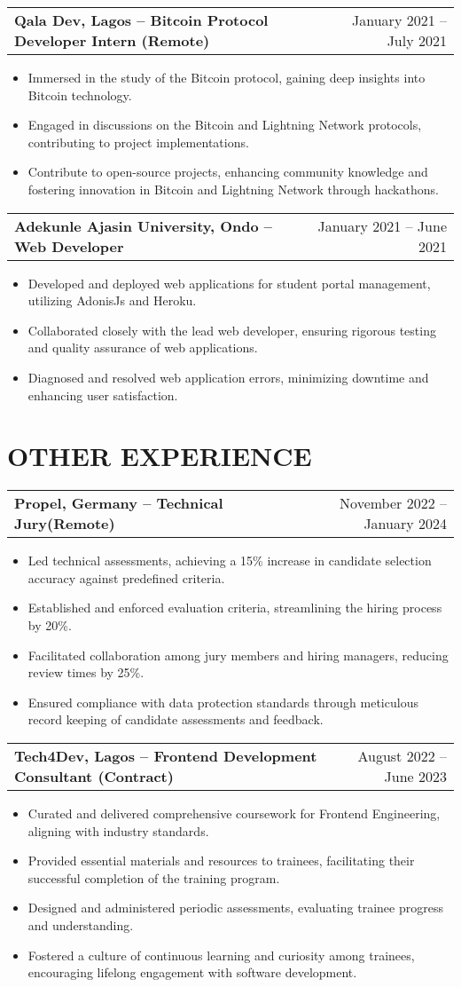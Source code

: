 \documentclass[a4paper,12pt]{article}
\makeatletter
\newenvironment{joblong}[2]{%
  \begin{tabularx}{\linewidth}{@{}X r@{}}%
    \textbf{#1} & #2 \\[3.75pt]%
  \end{tabularx}%
  \begin{minipage}[t]{\linewidth}%
  \begin{itemize}[nosep,after=\strut,leftmargin=1em,itemsep=3pt,label=--]%
  \ignorespaces
}{%
  \end{itemize}%
  \end{minipage}%
}
\makeatother
\begin{document}
\begin{joblong}{Qala Dev, Lagos -- Bitcoin Protocol Developer Intern (Remote)}{January 2021 -- July 2021}
\item Immersed in the study of the Bitcoin protocol, gaining deep insights into Bitcoin technology.
\item Engaged in discussions on the Bitcoin and Lightning Network protocols, contributing to project implementations.
\item Contribute to open-source projects, enhancing community knowledge and fostering innovation in Bitcoin and Lightning Network through hackathons.
\end{joblong}

\begin{joblong}{Adekunle Ajasin University, Ondo -- Web Developer}{January 2021 -- June 2021}
\item Developed and deployed web applications for student portal management, utilizing AdonisJs and Heroku.
\item Collaborated closely with the lead web developer, ensuring rigorous testing and quality assurance of web applications.
\item Diagnosed and resolved web application errors, minimizing downtime and enhancing user satisfaction.
\end{joblong}

\section{OTHER EXPERIENCE}

\begin{joblong}{Propel, Germany -- Technical Jury(Remote)}{November 2022 -- January 2024}
\item Led technical assessments, achieving a 15\% increase in candidate selection accuracy against predefined criteria.
\item Established and enforced evaluation criteria, streamlining the hiring process by 20\%.
\item Facilitated collaboration among jury members and hiring managers, reducing review times by 25\%.
\item Ensured compliance with data protection standards through meticulous record keeping of candidate assessments and feedback.
\end{joblong}

\begin{joblong}{Tech4Dev, Lagos -- Frontend Development Consultant (Contract)}{August 2022 -- June 2023}
\item Curated and delivered comprehensive coursework for Frontend Engineering, aligning with industry standards.
\item Provided essential materials and resources to trainees, facilitating their successful completion of the training program.
\item Designed and administered periodic assessments, evaluating trainee progress and understanding.
\item Fostered a culture of continuous learning and curiosity among trainees, encouraging lifelong engagement with software development.
\end{joblong}
\end{document}
